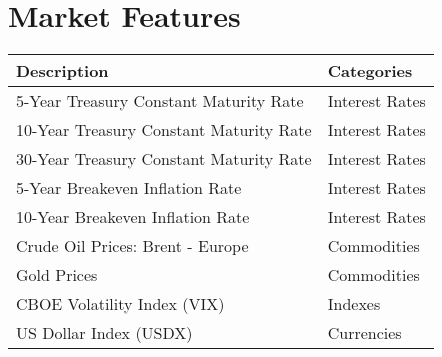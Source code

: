 \chapter{Market Features}
\label{appendix:features_list}
\par
\begin{longtable}{|| m{10cm}| m{3.5cm}||}
\hline
Description & Categories \\ \hline \hline
5-Year Treasury Constant Maturity Rate & Interest Rates\\ \hline
10-Year Treasury Constant Maturity Rate & Interest Rates\\ \hline
30-Year Treasury Constant Maturity Rate & Interest Rates\\ \hline
5-Year Breakeven Inflation Rate & Interest Rates\\ \hline
10-Year Breakeven Inflation Rate & Interest Rates\\ \hline
Crude Oil Prices: Brent - Europe &  Commodities\\ \hline
Gold Prices &  Commodities\\ \hline
CBOE Volatility Index (VIX) &  Indexes\\ \hline
US Dollar Index (USDX) &  Currencies\\ \hline
\end{longtable}